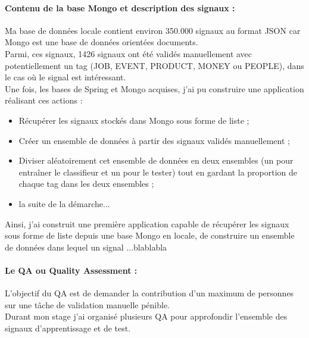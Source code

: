             \paragraph{Contenu de la base Mongo et description des signaux :}
                Ma base de données locale contient environ 350.000 signaux au format JSON car Mongo est une base de données orientées documents.\\
            Parmi, ces signaux, 1426 signaux ont été validés manuellement avec potentiellement un tag (JOB, EVENT, PRODUCT, MONEY ou PEOPLE), dans le cas où le signal est intéressant.\\
            Une fois, les bases de Spring et Mongo acquises, j'ai pu construire une application réalisant ces actions :
            \begin{itemize}
                \item Récupérer les signaux stockés dans Mongo sous forme de liste ;
                \item Créer un ensemble de données à partir des signaux validés manuellement ;
                \item Diviser aléatoirement cet ensemble de données en deux ensembles (un pour entraîner le classifieur et un pour le tester) tout en gardant la proportion de chaque tag dans les deux ensembles ;
                \item la suite de la démarche...
            \end{itemize}
        Ainsi, j'ai construit une première application capable de récupérer les signaux sous forme de liste depuis une base Mongo en locale, de construire un ensemble de données dans lequel un signal ...blablabla

        \paragraph{Le QA ou Quality Assessment :}
            L'objectif du QA est de demander la contribution d'un maximum de personnes sur une tâche de validation manuelle pénible.\\
            Durant mon stage j'ai organisé plusieurs QA pour approfondir l'ensemble des signaux d’apprentissage et de test.

